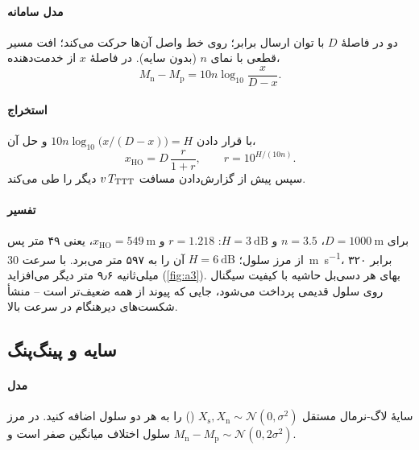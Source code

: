 \documentclass[11pt,a4paper]{article}
\begin{document}
\paragraph{مدل سامانه} دو  در فاصلهٔ $D$ با توان ارسال برابر؛  روی خط واصل آن‌ها
حرکت می‌کند؛ افت مسیر قطعی با نمای $n$ (بدون سایه). در فاصلهٔ $x$ از  خدمت‌دهنده،
\begin{equation}
  M_\mathrm{n} - M_\mathrm{p} = 10n\log_{10}\frac{x}{D-x}.
\end{equation}
\paragraph{استخراج} با قرار دادن $10n\log_{10}\bigl(x/(D-x)\bigr) = H$ و حل آن،
\begin{equation}\label{eq:hopoint}
  x_{\mathrm{HO}} = D\,\frac{r}{1+r}, \qquad r = 10^{H/(10n)} .
\end{equation}
 سپس پیش از گزارش‌دادن مسافت $v\,T_{\mathrm{TTT}}$ دیگر را طی می‌کند.
\paragraph{تفسیر} برای $D = \qty{1000}{\metre}$، $n=3.5$ و $H = \qty{3}{\dB}$: $r=1.218$ و
$x_{\mathrm{HO}} = \qty{549}{\metre}$، یعنی ۴۹ متر پس از مرز سلول؛ $H = \qty{6}{\dB}$ آن را به ۵۹۷ متر
می‌برد. با سرعت \qty{30}{\metre\per\second}،  برابر ۳۲۰ میلی‌ثانیه ۹٫۶ متر دیگر می‌افزاید
(\cref{fig:a3}). بهای هر دسی‌بل حاشیه با کیفیت سیگنال روی سلول قدیمی پرداخت می‌شود، جایی که پیوند
از همه ضعیف‌تر است -- منشأ شکست‌های دیرهنگام در سرعت بالا.

\begin{acnfigure}
  \caption{راه‌اندازی : همسایه باید به مدت $\TTT = 320$\, به اندازهٔ
  $\Off + \Hys = 3$\, (نقطه‌چین) از سلول خدمت‌دهنده بهتر باشد تا گزارش اندازه‌گیری ارسال شود.}
  \label{fig:a3}
\end{acnfigure}

\subsection{سایه و پینگ‌پنگ}\label{sec:pingpong}
\paragraph{مدل} سایهٔ لاگ-نرمال مستقل $X_\mathrm{s}, X_\mathrm{n}\sim\mathcal{N}(0,\sigma^2)$ () را
به هر دو سلول اضافه کنید. در مرز سلول اختلاف میانگین صفر است و
$M_\mathrm{n} - M_\mathrm{p} \sim \mathcal{N}(0, 2\sigma^2)$.
\end{document}
